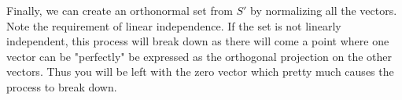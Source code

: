\documentclass[11pt,a4paper]{report}
\theoremstyle{plain}
\theoremstyle{definition}
\begin{document}
Finally, we can create an orthonormal set from $S'$ by normalizing all the vectors. \\

Note the requirement of linear independence. If the set is not linearly independent, this process will break down as there will come a point where one vector can be "perfectly" be expressed as the orthogonal projection on the other vectors. Thus you will be left with the zero vector which pretty much causes the process to break down.
\end{document}
